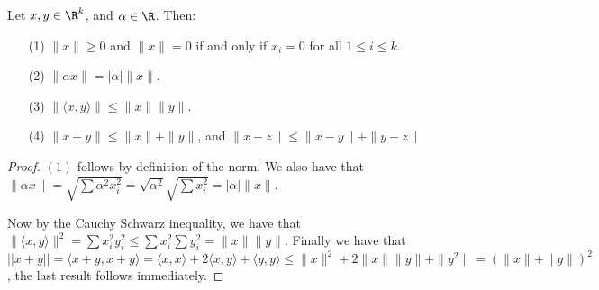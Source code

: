 \begin{theorem}\label{1.5.2}
    Let $x,y \in \R^k$, and  $\alpha \in \R$. Then:
         \begin{enumerate}
             \item[(1)] $\|x\| \geq 0$ and $\|x\|=0$ if and only if $x_i=0$ for
                 all $1 \leq i \leq k$.

             \item[(2)] $\|\alpha x\|=|\alpha|\|x\|$.

             \item[(3)] $\|\langle x,y \rangle\| \leq \|x\|\|y\|$.

             \item[(4)] $\|x+y\| \leq \|x\|+\|y\|$, and $\|x-z\| \leq \|x-y\|+\|y-z\|$
        \end{enumerate}
\end{theorem}
\begin{proof}
    $(1)$ follows by definition of the norm. We also have that  $\|\alpha x\|=\sqrt{\sum{\alpha^2x_i^2}}
    =\sqrt{\alpha^2}\sqrt{\sum{x_i^2}}=|\alpha|\|x\|$.

    Now by the Cauchy Schwarz inequality, we have that $\|\langle x,y \rangle\|^2
    =\sum{x_i^2y_i^2} \leq \sum{x_i^2}\sum{y_i^2}=\|x\|\|y\|$. Finally we have
    that $||x+y||=\langle x+y,x+y \rangle=\langle x,x \rangle+2\langle x,y \rangle
    + \langle y,y \rangle \leq \|x\|^2+2\|x\|\|y\|+\|y^2\|=(\|x\|+\|y\|)^2$,
    the last result follows immediately.
\end{proof}
